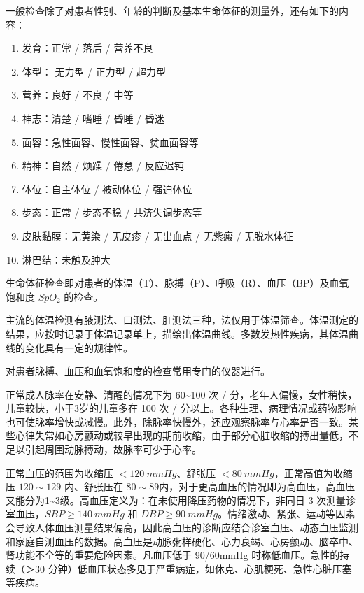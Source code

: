 \documentclass[9pt,a4paper,twoside]{rho-class/rho}
\begin{document}
    一般检查除了对患者性别、年龄的判断及基本生命体征的测量外，还有如下的内容：
    \begin{enumerate}
        \item 发育：正常 / 落后 / 营养不良
        \item 体型： 无力型 / 正力型 / 超力型
        \item 营养：良好 / 不良 / 中等
        \item 神志：清楚 / 嗜睡 / 昏睡 / 昏迷
        \item 面容：急性面容、慢性面容、贫血面容等
	    \item 精神：自然 / 烦躁 / 倦怠 / 反应迟钝
        \item 体位：自主体位 / 被动体位 / 强迫体位
        \item 步态：正常 / 步态不稳 / 共济失调步态等
        \item 皮肤黏膜：无黄染 / 无皮疹 / 无出血点 / 无紫癜 / 无脱水体征
        \item 淋巴结：未触及肿大
    \end{enumerate}

    生命体征检查即对患者的体温（T）、脉搏（P）、呼吸（R）、血压（BP）及血氧饱和度 $SpO_2$ 的检查。

    主流的体温检测有腋测法、口测法、肛测法三种，法仅用于体温筛查。体温测定的结果，应按时记录于体温记录单上，描绘出体温曲线。多数发热性疾病，其体温曲线的变化具有一定的规律性。

    对患者脉搏、血压和血氧饱和度的检查常用专门的仪器进行。
    
    正常成人脉率在安静、清醒的情况下为 60\textasciitilde100 次 / 分，老年人偏慢，女性稍快，儿童较快，小于3岁的儿童多在 100 次 / 分以上。各种生理、病理情况或药物影响也可使脉率增快或减慢。此外，除脉率快慢外，还应观察脉率与心率是否一致。某些心律失常如心房颤动或较早出现的期前收缩，由于部分心脏收缩的搏出量低，不足以引起周围动脉搏动，故脉率可少于心率。
    
    正常血压的范围为收缩压 $<120\ mmHg$、舒张压 $<80\ mmHg$，正常高值为收缩压 $120\sim129$ 内、舒张压在 $80\sim89$内，对于更高血压的情况即为高血压，高血压又能分为1\textasciitilde3级。高血压定义为：在未使用降压药物的情况下，非同日 3 次测量诊室血压，$SBP\ge140\ mmHg$ 和 $DBP\ge90\ mmHg$。情绪激动、紧张、运动等因素会导致人体血压测量结果偏高，因此高血压的诊断应结合诊室血压、动态血压监测和家庭自测血压的数据。高血压是动脉粥样硬化、心力衰竭、心房颤动、脑卒中、肾功能不全等的重要危险因素。凡血压低于 90/60mmHg 时称低血压。急性的持续（＞30 分钟）低血压状态多见于严重病症，如休克、心肌梗死、急性心脏压塞等疾病。
\end{document}
